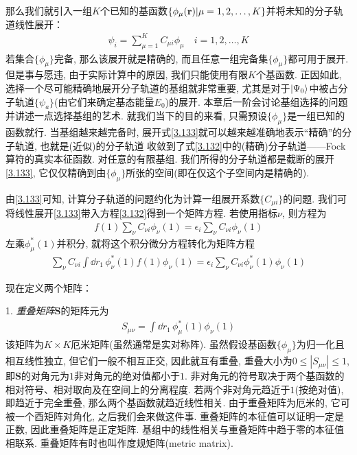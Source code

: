 那么我们就引入一组$K$个已知的基函数$\{\phi_\mu(\mathbf{r})|\mu=1,2,\ldots,K\}$并将未知的分子轨道线性展开：
\begin{align}
	\label{3.133}
	\psi_i = \sum_{\mu=1}^{K}C_{\mu i}\phi_\mu\quad i = 1,2,\ldots,K
\end{align}
若集合$\{\phi_\mu\}$完备, 
那么该展开就是精确的, 
而且任意一组完备集$\{\phi_\mu\}$都可用于展开. 
但是事与愿违, 
由于实际计算中的原因, 
我们只能使用有限$K$个基函数. 
正因如此, 
选择一个尽可能精确地展开分子轨道的基组就非常重要, 
尤其是对于$\Ket{\Psi_0}$中被占分子轨道$\{\psi_a\}$(由它们来确定基态能量$E_0$)的展开. 
本章后一阶会讨论基组选择的问题并讲述一点选择基组的艺术. 
就我们当下的目的来看, 
只需预设$\{\phi_\mu\}$是一组已知的函数就行. 
当基组越来越完备时, 
展开式\eqref{3.133}就可以越来越准确地表示“精确”的分子轨道, 
也就是(近似)的分子轨道 收敛到了式\eqref{3.132}中的(精确)分子轨道——Fock算符的真实本征函数. 
对任意的有限基组. 
我们所得的分子轨道都是截断的展开\eqref{3.133}, 
它仅仅精确到由$\{\phi_\mu\}$所张的空间(即在仅这个子空间内是精确的).


由\eqref{3.133}可知, 
计算\hft 分子轨道的问题约化为计算一组展开系数$\{C_{\mu i} \}$的问题. 
我们可将线性展开\eqref{3.133}带入\hft 方程\eqref{3.132}得到一个矩阵方程. 
若使用指标$\nu$, 
则方程为
\begin{align}
	f(1) \sum_\nu C_{\nu i}\phi_\nu(1) = \epsilon_i\sum_\nu C_{\nu i}\phi_\nu(1) 
\end{align}
左乘$\phi_\mu^*(1)$并积分, 
就将这个积分微分方程转化为矩阵方程
\begin{align}
	\label{3.135}
	\sum_\nu C_{\nu i}\int\dd{r}_1\,\phi_\nu^*(1)f(1)\phi_\nu(1) = \epsilon_i\sum_\nu C_{\nu i}\phi_\nu^*(1)\phi_\nu(1)
\end{align}

现在定义两个矩阵：

1. \emph{重叠矩阵$\mathbf{S}$}的矩阵元为
\begin{align}
	S_{\mu\nu}=\int\dd{r}_1\,\phi_\mu^*(1)\phi_\nu(1)
\end{align}
该矩阵为$K\times K$厄米矩阵(虽然通常是实对称阵). 
虽然假设基函数$\{\phi_\mu\}$为归一化且相互线性独立, 
但它们一般不相互正交, 
因此就互有重叠, 
重叠大小为$0\leqslant|S_{\mu\nu}|\leqslant1$, 
即$\mathbf{S}$的对角元为$1$非对角元的绝对值都小于$1$. 
非对角元的符号取决于两个基函数的相对符号、相对取向及在空间上的分离程度. 
若两个非对角元趋近于$1$(按绝对值), 
即趋近于完全重叠, 
那么两个基函数就趋近线性相关. 
由于重叠矩阵为厄米的, 
它可被一个酉矩阵对角化, 
之后我们会来做这件事. 
重叠矩阵的本征值可以证明一定是正数, 
因此重叠矩阵是正定矩阵. 
基组中的线性相关与重叠矩阵中趋于零的本征值相联系. 
重叠矩阵有时也叫作度规矩阵(metric matrix). 


